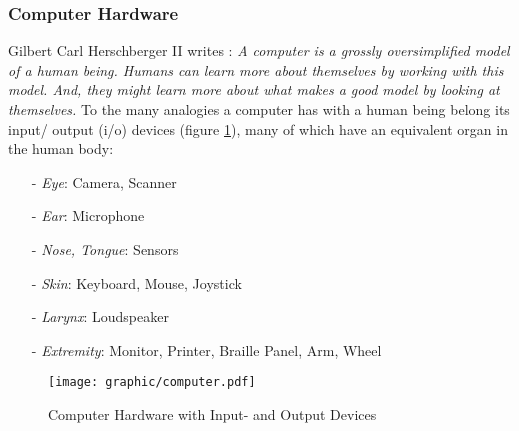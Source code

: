 %
%
%
%
%
%
%

\subsubsection{Computer Hardware}
\label{computer_hardware_heading}

Gilbert Carl Herschberger II writes \cite{josgeneral}: \textit{A computer is a
grossly oversimplified model of a human being. Humans can learn more about
themselves by working with this model. And, they might learn more about what
makes a good model by looking at themselves.} To the many analogies a computer
has with a human being belong its input/ output (i/o) devices (figure
\ref{computer_figure}), many of which have an equivalent organ in the human
body:

\begin{itemize}
    \item[-] \emph{Eye}: Camera, Scanner
    \item[-] \emph{Ear}: Microphone
    \item[-] \emph{Nose, Tongue}: Sensors
    \item[-] \emph{Skin}: Keyboard, Mouse, Joystick
    \item[-] \emph{Larynx}: Loudspeaker
    \item[-] \emph{Extremity}: Monitor, Printer, Braille Panel, Arm, Wheel
\end{itemize}

\begin{figure}[ht]
    \begin{center}
        \texttt{[image: graphic/computer.pdf]}
        \caption{Computer Hardware with Input- and Output Devices}
        \label{computer_figure}
    \end{center}
\end{figure}

